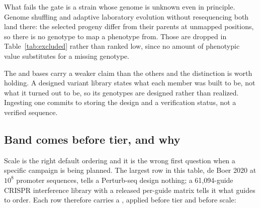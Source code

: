 What fails the gate is a strain whose genome is unknown even in principle. Genome shuffling
and adaptive laboratory evolution without resequencing both land there: the selected
progeny differ from their parents at unmapped positions, so there is no genotype to map a
phenotype from. Those are dropped in Table~\ref{tab:excluded} rather than ranked low, since
no amount of phenotypic value substitutes for a missing genotype.

The  and  bases carry a weaker claim than the
others and the distinction is worth holding. A designed variant library states what each
member was built to be, not what it turned out to be, so its genotypes are designed rather
than realized. Ingesting one commits to storing the design and a verification status, not a
verified sequence.

\subsection{Band comes before tier, and why}\label{sec:band}

Scale is the right default ordering and it is the wrong first question when a specific
campaign is being planned. The largest row in this table, de Boer 2020 at $10^8$ promoter
sequences, tells a Perturb-seq design nothing; a 61,094-guide CRISPR interference library
with a released per-guide matrix tells it what guides to order. Each row therefore carries
a , applied before tier and before scale:

